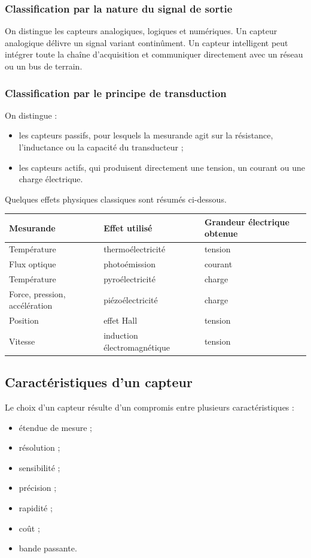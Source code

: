 \subsubsection{Classification par la nature du signal de sortie}

On distingue les capteurs analogiques, logiques et numériques. Un capteur analogique délivre un signal variant continûment. Un capteur intelligent peut intégrer toute la chaîne d'acquisition et communiquer directement avec un réseau ou un bus de terrain.

\subsubsection{Classification par le principe de transduction}

On distingue :
\begin{itemize}
  \item les capteurs passifs, pour lesquels la mesurande agit sur la résistance, l'inductance ou la capacité du transducteur ;
  \item les capteurs actifs, qui produisent directement une tension, un courant ou une charge électrique.
\end{itemize}

Quelques effets physiques classiques sont résumés ci-dessous.

\begin{center}
\begin{tabular}{lll}
\toprule
Mesurande & Effet utilisé & Grandeur électrique obtenue \\
\midrule
Température & thermoélectricité & tension \\
Flux optique & photoémission & courant \\
Température & pyroélectricité & charge \\
Force, pression, accélération & piézoélectricité & charge \\
Position & effet Hall & tension \\
Vitesse & induction électromagnétique & tension \\
\bottomrule
\end{tabular}
\end{center}

\subsection{Caractéristiques d'un capteur}

Le choix d'un capteur résulte d'un compromis entre plusieurs caractéristiques :
\begin{itemize}
  \item étendue de mesure ;
  \item résolution ;
  \item sensibilité ;
  \item précision ;
  \item rapidité ;
  \item coût ;
  \item bande passante.
\end{itemize}

